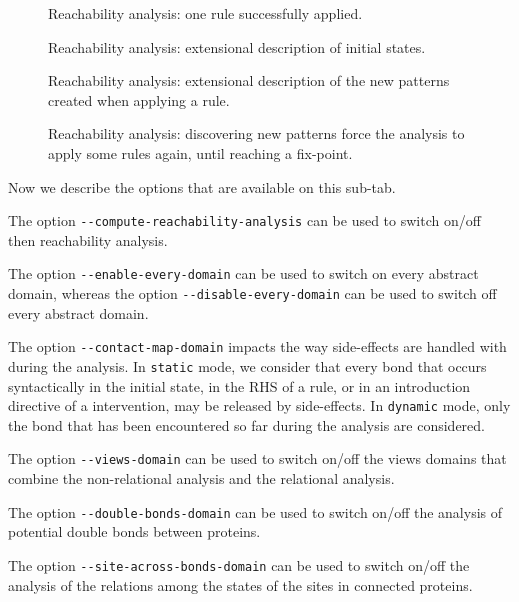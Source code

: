 \documentclass[11pt]{book}
\begin{document}
\begin{figure}[htbp]

\caption{Reachability analysis: one rule successfully applied.}
\label{fig:reachability_medium_ok}
\end{figure}

\begin{figure}[htbp]

\caption{Reachability analysis: extensional description of initial states.}
\label{fig:reachability_high_init}
\end{figure}

\begin{figure}[htbp]

\caption{Reachability analysis: extensional description of the new patterns  created when applying a rule.}
\label{fig:reachability_high_rule}
\end{figure}

\begin{figure}[htbp]

\caption{Reachability analysis: discovering new patterns force the analysis to apply some rules again, until reaching a fix-point.}
\label{fig:reachability_full}
\end{figure}

Now we describe the options that are available on this sub-tab.

The option \verb?--compute-reachability-analysis? can be used to switch on/off then reachability analysis.

The option \verb?--enable-every-domain? can be used to switch on every abstract domain, whereas the option \verb?--disable-every-domain? can be used to switch off every abstract domain.

The option \verb?--contact-map-domain? impacts the way side-effects are handled with during the analysis. In \verb?static? mode, we consider that every bond that occurs syntactically in the initial state, in the RHS of a rule, or in an introduction directive of a intervention, may be released by side-effects.
In \verb?dynamic? mode, only the bond that has been encountered so far during the analysis are considered.

The option \verb?--views-domain? can be used to switch on/off the views domains that combine the non-relational analysis and the relational analysis.

The option \verb?--double-bonds-domain? can be used to switch on/off the analysis of potential double bonds between proteins.

The option \verb?--site-across-bonds-domain? can be used to switch on/off the analysis of the relations among the states of the sites in connected proteins.
\end{document}
